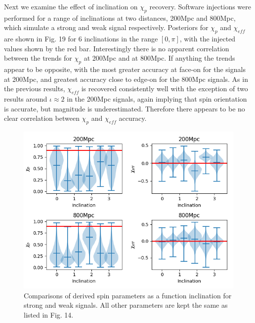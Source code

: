 \documentclass[11pt]{article}
\begin{document}
Next we examine the effect of inclination on $\chi_p$ recovery. Software injections were performed for a range of inclinations at two distances, 200Mpc and 800Mpc, which simulate a strong and weak signal respectively. Posteriors for $\chi_p$ and $\chi_{eff}$ are shown in Fig. 19 for 6 inclinations in the range $[0,\pi]$, with the injected values shown by the red bar. Interestingly there is no apparent correlation between the trends for $\chi_p$ at 200Mpc and at 800Mpc. If anything the trends appear to be opposite, with the most greater accuracy at face-on for the signals at 200Mpc, and greatest accuracy close to edge-on for the 800Mpc signals. As in the previous results, $\chi_{eff}$ is recovered consistently well with the exception of two results around $\iota\approx2$ in the 200Mpc signals, again implying that spin orientation is accurate, but magnitude is underestimated. Therefore there appears to be no clear correlation between $\chi_p$ and $\chi_{eff}$ accuracy.
\begin{figure}[h]
	\includegraphics[width=1\textwidth]{fig19.png}
	\centering
	\caption{Comparisons of derived spin parameters as a function inclination for strong and weak signals. All other parameters are kept the same as listed in Fig. 14.}
	\centering
\end{figure}
\end{document}
